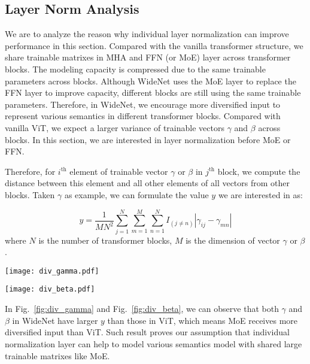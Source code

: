 \documentclass[letterpaper]{article} \usepackage{aaai22}  \usepackage{times}  \usepackage{helvet}  \usepackage{courier}  \usepackage[hyphens]{url}  \usepackage{graphicx} \urlstyle{rm} \def\UrlFont{\rm}  \usepackage{natbib}  \usepackage{caption} \DeclareCaptionStyle{ruled}{labelfont=normalfont,labelsep=colon,strut=off} \frenchspacing  \setlength{\pdfpagewidth}{8.5in}  \setlength{\pdfpageheight}{11in}  \usepackage{algorithm}
\begin{document}
\subsection{Layer Norm Analysis} 

We are to analyze the reason why individual layer normalization can improve performance in this section. Compared with the vanilla transformer structure, we share trainable matrixes in MHA and FFN (or MoE) layer across transformer blocks. The modeling capacity is compressed due to the same trainable parameters across blocks. Although WideNet uses the MoE layer to replace the FFN layer to improve capacity, different blocks are still using the same trainable parameters. Therefore, in WideNet, we encourage more diversified input to represent various semantics in different transformer blocks. Compared with vanilla ViT, we expect a larger variance of trainable vectors $\gamma$ and $\beta$ across blocks. In this section, we are interested in layer normalization before MoE or FFN.

Therefore, for $i^{\mathrm{th}}$ element of trainable vector $\gamma$ or $\beta$ in $j^{\mathrm{th}}$ block, we compute the distance between this element and all other elements of all vectors from other blocks. Taken $\gamma$ as example, we can formulate the value $y$ we are interested in as:

\begin{equation}
y= \frac{1}{MN^2} \sum_{j=1}^N  \sum_{m=1}^M \sum_{n=1}^N I_{(j\not = n)} | \gamma_{ij} - \gamma_{mn} |
\end{equation}
where $N$ is the number of transformer blocks, $M$ is the dimension of vector $\gamma$ or $\beta$.

\begin{figure*}
\centering
\begin{minipage}[b]{.45\textwidth}
\texttt{[image: div\_gamma.pdf]}
\caption{Divergence of $\gamma$ with LayerNorm layers.}\label{fig:div_gamma}
\end{minipage}\hfill
\begin{minipage}[b]{.45\textwidth}
\texttt{[image: div\_beta.pdf]}
\caption{Divergence of $\beta$ with LayerNorm layers.}\label{fig:div_beta}
\end{minipage}
\end{figure*}

In Fig.~\ref{fig:div_gamma} and Fig.~\ref{fig:div_beta}, we can observe that both $\gamma$ and $\beta$ in WideNet have larger $y$ than those in ViT, which means MoE receives more diversified input than ViT. Such result proves our assumption that individual normalization layer can help to model various semantics model with shared large trainable matrixes like MoE. 
\end{document}
